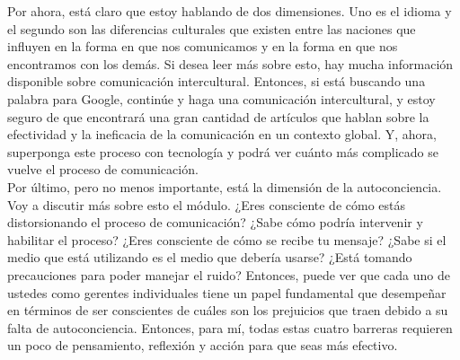 \documentclass[10pt]{book}
\begin{document}
Por ahora, está claro que estoy hablando de dos dimensiones. Uno es el idioma y el segundo son las diferencias culturales que existen entre las naciones que influyen en la forma en que nos comunicamos y en la forma en que nos encontramos con los demás. Si desea leer más sobre esto, hay mucha información disponible sobre comunicación intercultural. Entonces, si está buscando una palabra para Google, continúe y haga una comunicación intercultural, y estoy seguro de que encontrará una gran cantidad de artículos que hablan sobre la efectividad y la ineficacia de la comunicación en un contexto global. Y, ahora, superponga este proceso con tecnología y podrá ver cuánto más complicado se vuelve el proceso de comunicación.\\
Por último, pero no menos importante, está la dimensión de la autoconciencia. Voy a discutir más sobre esto el módulo. ¿Eres consciente de cómo estás distorsionando el proceso de comunicación? ¿Sabe cómo podría intervenir y habilitar el proceso? ¿Eres consciente de cómo se recibe tu mensaje? ¿Sabe si el medio que está utilizando es el medio que debería usarse? ¿Está tomando precauciones para poder manejar el ruido? Entonces, puede ver que cada uno de ustedes como gerentes individuales tiene un papel fundamental que desempeñar en términos de ser conscientes de cuáles son los prejuicios que traen debido a su falta de autoconciencia. Entonces, para mí, todas estas cuatro barreras requieren un poco de pensamiento, reflexión y acción para que seas más efectivo.
\end{document}
